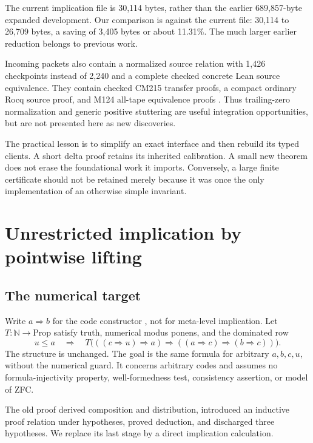 \documentclass[11pt]{article}
\newcommand{\imp}{\mathbin{\Rightarrow}}\newcommand{\Valid}{\operatorname{Valid}}\newcommand{\Sat}{\operatorname{Sat}}\newcommand{\Con}{\operatorname{Con}}\newcommand{\Halt}{\operatorname{Halt}}\newcommand{\PP}{\operatorname{P}}
\newcommand{\code}[1]{\texttt{\detokenize{#1}}}
\begin{document}
The current implication file is 30,114 bytes, rather than the earlier 689,857-byte expanded development. Our comparison is against the current file: 30,114 to 26,709 bytes, a saving of 3,405 bytes or about 11.31\%. The much larger earlier reduction belongs to previous work.

Incoming packets also contain a normalized source relation with 1,426 checkpoints instead of 2,240 and a complete checked concrete Lean source equivalence. They contain checked CM215 transfer proofs, a compact ordinary Rocq source proof, and M124 all-tape equivalence proofs \cite{incoming}. Thus trailing-zero normalization and generic positive stuttering are useful integration opportunities, but are not presented here as new discoveries.

The practical lesson is to simplify an exact interface and then rebuild its typed clients. A short delta proof retains its inherited calibration. A small new theorem does not erase the foundational work it imports. Conversely, a large finite certificate should not be retained merely because it was once the only implementation of an otherwise simple invariant.

\section{Unrestricted implication by pointwise lifting}
\label{sec:rho}

\subsection{The numerical target}

Write $a\imp b$ for the code constructor \code{wim a b}, not for meta-level implication. Let $T:\mathbb N\to\mathrm{Prop}$ satisfy truth, numerical modus ponens, and the dominated row
\begin{equation}
 u\le a\quad\Longrightarrow\quad
 T\bigl(((c\imp u)\imp a)\imp((a\imp c)\imp(b\imp c))\bigr).
 \label{eq:domrow}
\end{equation}
The \code{DomImp} structure is unchanged. The goal is the same formula for arbitrary $a,b,c,u$, without the numerical guard. It concerns arbitrary codes and assumes no formula-injectivity property, well-formedness test, consistency assertion, or model of ZFC.

The old proof derived composition and distribution, introduced an inductive proof relation under hypotheses, proved deduction, and discharged three hypotheses. We replace its last stage by a direct implication calculation.
\end{document}

